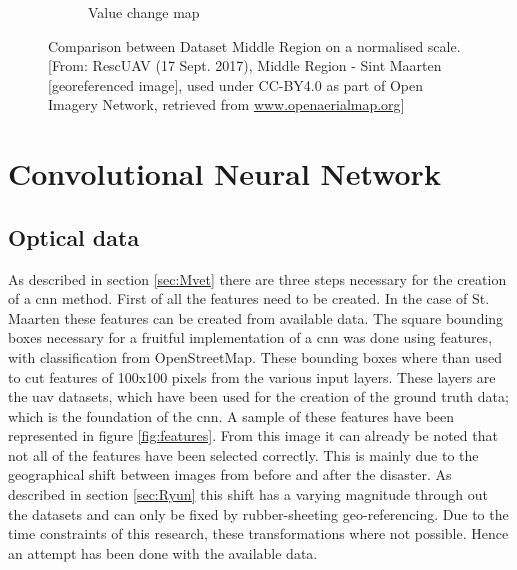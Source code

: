 \begin{figure}[h]
\begin{subfigure}{.8\textwidth}
	\caption{\footnotesize{Value change map}}
	\end{subfigure}
	\caption{\footnotesize{Comparison between Dataset Middle Region on a normalised scale. [From: RescUAV (17 Sept. 2017), Middle Region - Sint Maarten [georeferenced image], used under CC-BY4.0 as part of Open Imagery Network, retrieved from \url{www.openaerialmap.org}]}}
	\label{fig:MidComp}
\end{figure}
\clearpage
\section{Convolutional Neural Network} \label{sec:Rvet}
\subsection{Optical data} \label{sec:cno}
As described in section \ref{sec:Mvet} there are three steps necessary for the creation of a \ac{cnn} method. First of all the features need to be created. In the case of St. Maarten these features can be created from available data. The square bounding boxes necessary for a fruitful implementation of a \ac{cnn} was done using features, with classification from OpenStreetMap. These bounding boxes where than used to cut features of 100x100 pixels from the various input layers. These layers are the \ac{uav} datasets, which have been used for the creation of the ground truth data; which is the foundation of the \ac{cnn}. A sample of these features have been represented in figure \ref{fig:features}. From this image it can already be noted that not all of the features have been selected correctly. This is mainly due to the geographical shift between images from before and after the disaster. As described in section \ref{sec:Ryun} this shift has a varying magnitude through out the datasets and can only be fixed by rubber-sheeting geo-referencing. Due to the time constraints of this research, these transformations where not possible. Hence an attempt has been done with the available data.\\

